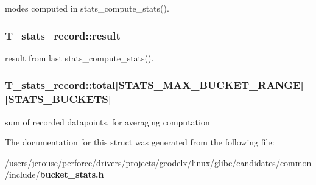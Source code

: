 modes computed in stats\_\-compute\_\-stats(). 
\subsubsection{ T\_\-stats\_\-record::result}\label{structT__stats__record_m2}


result from last stats\_\-compute\_\-stats(). 
\subsubsection{ T\_\-stats\_\-record::total[STATS\_\-MAX\_\-BUCKET\_\-RANGE][STATS\_\-BUCKETS]}\label{structT__stats__record_m1}


sum of recorded datapoints, for averaging computation 

The documentation for this struct was generated from the following file:\begin{CompactItemize}
\item 
/users/jcrouse/perforce/drivers/projects/geodelx/linux/glibc/candidates/common/include/{\bf bucket\_\-stats.h}\end{CompactItemize}
